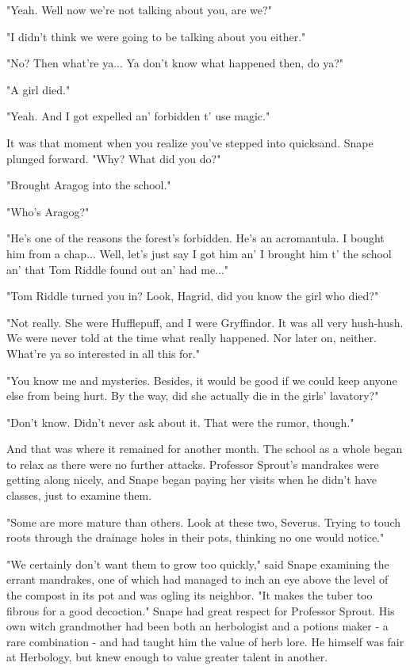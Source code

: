 \documentclass[a4paper,11pt]{article}
\begin{document}
"Yeah. Well now we're not talking about you, are we?"

"I didn't think we were going to be talking about you either."

"No? Then what're ya... Ya don't know what happened then, do ya?"

"A girl died."

"Yeah. And I got expelled an' forbidden t' use magic."

It was that moment when you realize you've stepped into quicksand. Snape plunged forward. "Why? What did you do?"

"Brought Aragog into the school."

"Who's Aragog?"

"He's one of the reasons the forest's forbidden. He's an acromantula. I bought him from a chap... Well, let's just say I got him an' I brought him t' the school an' that Tom Riddle found out an' had me..."

"Tom Riddle turned you in? Look, Hagrid, did you know the girl who died?"

"Not really. She were Hufflepuff, and I were Gryffindor. It was all very hush-hush. We were never told at the time what really happened. Nor later on, neither. What're ya so interested in all this for."

"You know me and mysteries. Besides, it would be good if we could keep anyone else from being hurt. By the way, did she actually die in the girls' lavatory?"

"Don't know. Didn't never ask about it. That were the rumor, though."

And that was where it remained for another month. The school as a whole began to relax as there were no further attacks. Professor Sprout's mandrakes were getting along nicely, and Snape began paying her visits when he didn't have classes, just to examine them.

"Some are more mature than others. Look at these two, Severus. Trying to touch roots through the drainage holes in their pots, thinking no one would notice."

"We certainly don't want them to grow too quickly," said Snape examining the errant mandrakes, one of which had managed to inch an eye above the level of the compost in its pot and was ogling its neighbor. "It makes the tuber too fibrous for a good decoction." Snape had great respect for Professor Sprout. His own witch grandmother had been both an herbologist and a potions maker - a rare combination - and had taught him the value of herb lore. He himself was fair at Herbology, but knew enough to value greater talent in another.
\end{document}
